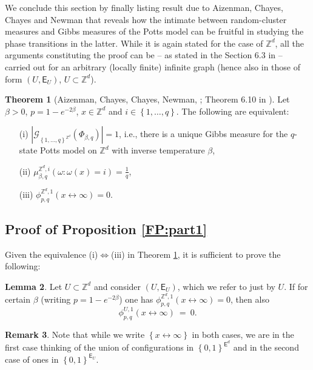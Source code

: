 \documentclass[12pt]{article}
\newcommand{\E}{\mathsf{E}}
\newcommand{\G}{\mathcal{G}}
\newcommand{\Z}{\mathbb{Z}}
\newcommand{\set}[1]{\left\{#1\right\}}
\newcommand{\1}{\mathbbm{1}}
\newcommand{\5}{\vspace{0.5cm}}
\theoremstyle{definition}
\newtheorem{thm}{Theorem}[section]
\newtheorem{rem}[thm]{Remark}
\newtheorem{lem}[thm]{Lemma}
\begin{document}
We conclude this section by finally listing result due to Aizenman, Chayes, Chayes and Newman that reveals how the intimate between random-cluster measures and Gibbs measures of the Potts model can be fruitful in studying the phase transitions in the latter. While it is again stated for the case of $\Z^d$, all the arguments constituting the proof can be -- as stated in the Section 6.3 in \cite{GHM} -- carried out for an arbitrary (locally finite) infinite graph (hence also in those of form $(U,\E_U)$, $U\subset\Z^d$).

\begin{thm}[Aizenman, Chayes, Chayes, Newman, \cite{ACCN}; Theorem 6.10 in \cite{GHM}]\label{ACCN} Let $\beta>0$, $p=1-e^{-2\beta}$, $x\in\Z^d$ and $i\in\set{1,\ldots,q}$. The following are equivalent:
\begin{itemize}
	\item[(i)] $|\G_{\set{1,\ldots,q}^{\Z^d}}(\Phi_{\beta,q})|=1$, i.e., there is a unique Gibbs measure for the $q$-state Potts model on $\Z^d$ with inverse temperature $\beta$,
	\item[(ii)] $\mu_{\beta,q}^{\Z^d,i}(\omega:\omega(x)=i)=\frac{1}{q}$,
	\item[(iii)] $\phi_{p,q}^{\Z^d,1}(x\leftrightarrow\infty)=0$.
\end{itemize}
\end{thm}


\subsection{Proof of Proposition \ref{FP:part1}}

Given the equivalence (i)$\Leftrightarrow$(iii) in Theorem \ref{ACCN}, it is sufficient to prove the following:
\begin{lem}\label{part1:MainLemma}
Let $U\subset\Z^d$ and consider $(U,\E_U)$, which we refer to just by $U$. If for certain $\beta$ (writing $p=1-e^{-2\beta}$) one has $\phi_{p,q}^{\Z^d,1}(x\leftrightarrow\infty)=0$, then also
$$\phi_{p,q}^{U,1}(x\leftrightarrow\infty) ~=~ 0.$$
\end{lem}
\begin{rem}
Note that while we write $\set{x\leftrightarrow\infty}$ in both cases, we are in the first case thinking of the union of configurations in $\set{0,1}^{\E^d}$ and in the second case of ones in $\set{0,1}^{\E_U}$.
\end{rem}
\end{document}
